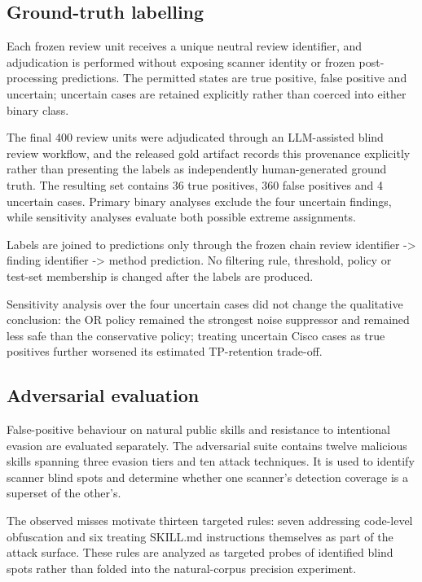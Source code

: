 \documentclass[conference]{IEEEtran}
\begin{document}
\subsection{Ground-truth labelling}

Each frozen review unit receives a unique neutral review identifier, and adjudication is performed without exposing scanner identity or frozen post-processing predictions. The permitted states are true positive, false positive and uncertain; uncertain cases are retained explicitly rather than coerced into either binary class.

The final 400 review units were adjudicated through an LLM-assisted blind review workflow, and the released gold artifact records this provenance explicitly rather than presenting the labels as independently human-generated ground truth. The resulting set contains 36 true positives, 360 false positives and 4 uncertain cases. Primary binary analyses exclude the four uncertain findings, while sensitivity analyses evaluate both possible extreme assignments.

Labels are joined to predictions only through the frozen chain review identifier -> finding identifier -> method prediction. No filtering rule, threshold, policy or test-set membership is changed after the labels are produced.

Sensitivity analysis over the four uncertain cases did not change the qualitative conclusion: the OR policy remained the strongest noise suppressor and remained less safe than the conservative policy; treating uncertain Cisco cases as true positives further worsened its estimated TP-retention trade-off.

\subsection{Adversarial evaluation}

False-positive behaviour on natural public skills and resistance to intentional evasion are evaluated separately. The adversarial suite contains twelve malicious skills spanning three evasion tiers and ten attack techniques. It is used to identify scanner blind spots and determine whether one scanner's detection coverage is a superset of the other's.

The observed misses motivate thirteen targeted rules: seven addressing code-level obfuscation and six treating SKILL.md instructions themselves as part of the attack surface. These rules are analyzed as targeted probes of identified blind spots rather than folded into the natural-corpus precision experiment.
\end{document}
